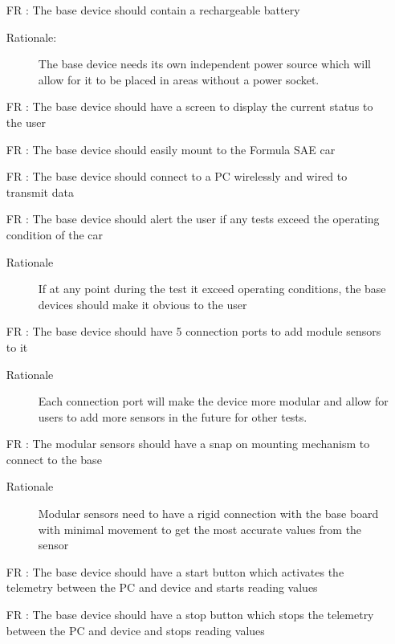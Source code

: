 \documentclass[12pt]{article}
\newcounter{reqnum} %
\begin{document}
\begin{itemize}
  \item[FR \refstepcounter{reqnum}\thereqnum:] The base device should contain a rechargeable battery
  \begin{description} \item[Rationale:] The base device needs its own independent power source which will allow for it to be placed in areas without a power socket. \end{description}
  
  
  \item[FR \refstepcounter{reqnum}\thereqnum:] The base device should have a screen to display the current status to the user
  
  \item[FR \refstepcounter{reqnum}\thereqnum:] The base device should easily mount to the Formula SAE car
  
  \item[FR \refstepcounter{reqnum}\thereqnum:] The base device should connect to a PC wirelessly and wired to transmit data
  
  \item[FR \refstepcounter{reqnum}\thereqnum:] The base device should alert the user if any tests exceed the operating condition of the car
  \begin{description} \item[Rationale] If at any point during the test it exceed operating conditions, the base devices should make it obvious to the user  \end{description}

  \item[FR \refstepcounter{reqnum}\thereqnum:] The base device should have 5 connection ports to add module sensors to it
  \begin{description} \item[Rationale] Each connection port will make the device more modular and allow for users to add more sensors in the future for other tests.  \end{description}
  
  \item[FR \refstepcounter{reqnum}\thereqnum:] The modular sensors should have a snap on mounting mechanism to connect to the base
  \begin{description} \item[Rationale] Modular sensors need to have a rigid connection with the base board with minimal movement to get the most accurate values from the sensor  \end{description}
  
  \item[FR \refstepcounter{reqnum}\thereqnum:] The base device should have a start button which activates the telemetry between the PC and device and starts reading values
  
  \item[FR \refstepcounter{reqnum}\thereqnum:] The base device should have a stop button which stops the telemetry between the PC and device and stops reading values
  
  \end{itemize}
\end{document}
